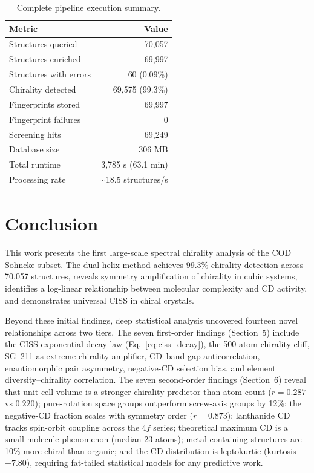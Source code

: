 \documentclass[11pt,a4paper]{article}
\begin{document}
\begin{table}[H]
\centering
\caption{Complete pipeline execution summary.}
\label{tab:pipeline}
\begin{tabular}{lr}
\toprule
Metric & Value \\
\midrule
Structures queried & 70,057 \\
Structures enriched & 69,997 \\
Structures with errors & 60 (0.09\%) \\
Chirality detected & 69,575 (99.3\%) \\
Fingerprints stored & 69,997 \\
Fingerprint failures & 0 \\
Screening hits & 69,249 \\
Database size & 306 MB \\
Total runtime & 3,785 s (63.1 min) \\
Processing rate & $\sim$18.5 structures/s \\
\bottomrule
\end{tabular}
\end{table}

\section{Conclusion}

This work presents the first large-scale spectral chirality analysis of the COD Sohncke subset. The dual-helix method achieves 99.3\% chirality detection across 70,057 structures, reveals symmetry amplification of chirality in cubic systems, identifies a log-linear relationship between molecular complexity and CD activity, and demonstrates universal CISS in chiral crystals.

Beyond these initial findings, deep statistical analysis uncovered fourteen novel relationships across two tiers. The seven first-order findings (Section~5) include the CISS exponential decay law (Eq.~\ref{eq:ciss_decay}), the 500-atom chirality cliff, SG~211 as extreme chirality amplifier, CD--band gap anticorrelation, enantiomorphic pair asymmetry, negative-CD selection bias, and element diversity--chirality correlation. The seven second-order findings (Section~6) reveal that unit cell volume is a stronger chirality predictor than atom count ($r = 0.287$ vs $0.220$); pure-rotation space groups outperform screw-axis groups by 12\%; the negative-CD fraction scales with symmetry order ($r = 0.873$); lanthanide CD tracks spin-orbit coupling across the $4f$ series; theoretical maximum CD is a small-molecule phenomenon (median 23 atoms); metal-containing structures are 10\% more chiral than organic; and the CD distribution is leptokurtic (kurtosis $+7.80$), requiring fat-tailed statistical models for any predictive work.
\end{document}
